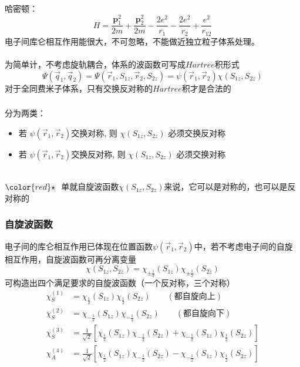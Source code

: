 \begin{frame}[label=current]
  \frametitle{}
哈密顿： 
  \[
    H=\frac{\mathbf{p}_1^2}{2 m}+\frac{\mathbf{p}_2^2}{2 m}-\frac{2 e^2}{r_1}-\frac{2 e^2}{r_2}+\frac{e^2}{r_{12}}
    \]
电子间库仑相互作用能很大，不可忽略，不能做近独立粒子体系处理。\\
~~\\ 
为简单计，不考虑旋轨耦合，体系的波函数可写成$Hartree$积形式
\[ \Psi(\vec{q}_1, \vec{q}_2) = \Psi(\vec{r}_1, S_{1z}, \vec{r}_2, S_{2z}) = \psi(\vec{r}_1, \vec{r}_2) \chi (S_{1z}, S_{2z})\]
对于全同费米子体系，只有交换反对称的$Hartree$积才是合法的
\end{frame} 

\begin{frame}[label=current]
  \frametitle{}
 分为两类：
  \begin{itemize}
    \item 若 $\psi(\vec{r}_1, \vec{r}_2)$交换对称, 则 $\chi (S_{1z}, S_{2z})  $ 必须交换反对称
    \item 若 $\psi(\vec{r}_1, \vec{r}_2)$交换反对称, 则 $\chi (S_{1z}, S_{2z}) $ 必须交换对称
  \end{itemize}

  ~~\\ 
  ${\color{red}\star}~$ 单就自旋波函数$\chi (S_{1z}, S_{2z}) $来说，它可以是对称的，也可以是反对称的
\end{frame} 

\begin{frame}[label=current]
  \frametitle{自旋波函数}
  电子间的库仑相互作用已体现在位置函数$\psi(\vec{r}_1, \vec{r}_2)$中，若不考虑电子间的自旋相互作用，自旋波函数可再分离变量
  $$\chi (S_{1z}, S_{2z}) = \chi _{\pm \frac{1}{2}} (S_{1z})\chi_{\pm \frac{1}{2}} (S_{2z}) $$
  可构造出四个满足要求的自旋波函数（一个反对称，三个对称）
  \[ 
    \begin{aligned}
      \chi ^{(1)} _S &= \chi _{ \frac{1}{2}} (S_{1z})\chi_{ \frac{1}{2}} (S_{2z})  \qquad (\text{都自旋向上})\\ 
      \chi ^{(2)} _S &= \chi _{ -\frac{1}{2}} (S_{1z})\chi_{ -\frac{1}{2}} (S_{2z})  \qquad (\text{都自旋向下}) \\ 
      \chi ^{(3)} _S &= \frac{1}{\sqrt{2} }\left[\chi _{ \frac{1}{2}} (S_{1z})\chi_{ -\frac{1}{2}} (S_{2z})  + \chi _{ -\frac{1}{2}} (S_{1z})\chi_{\frac{1}{2}} (S_{2z})\right] \\ 
      \chi ^{(4)} _A &= \frac{1}{\sqrt{2} }\left[\chi _{ \frac{1}{2}} (S_{1z})\chi_{ -\frac{1}{2}} (S_{2z})  - \chi _{ -\frac{1}{2}} (S_{1z})\chi_{\frac{1}{2}} (S_{2z})\right] 
    \end{aligned}\]
\end{frame} 

